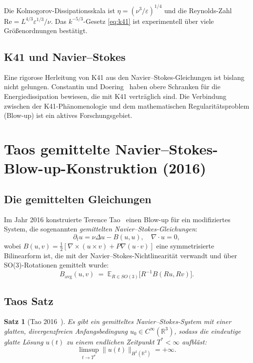 \documentclass[12pt,a4paper]{article}
\newtheorem{theorem}{Satz}[section]
\theoremstyle{remark}
\begin{document}
Die Kolmogorov-Dissipationsskala ist $\eta = (\nu^3/\varepsilon)^{1/4}$ und die Reynolds-Zahl
$\mathrm{Re} = L^{4/3}\varepsilon^{1/3}/\nu$. Das $k^{-5/3}$-Gesetz \eqref{eq:k41}
ist experimentell über viele Größenordnungen bestätigt.

\subsection{K41 und Navier--Stokes}

Eine rigorose Herleitung von K41 aus den Navier--Stokes-Gleichungen ist bislang nicht
gelungen. Constantin und Doering~\cite{ConstantinDoering1994} haben obere Schranken für
die Energiedissipation bewiesen, die mit K41 verträglich sind. Die Verbindung zwischen der
K41-Phänomenologie und dem mathematischen Regularitätsproblem (Blow-up) ist ein aktives
Forschungsgebiet.

\section{Taos gemittelte Navier--Stokes-Blow-up-Konstruktion (2016)}

\subsection{Die gemittelten Gleichungen}

Im Jahr 2016 konstruierte Terence Tao~\cite{Tao2016} einen Blow-up für ein modifiziertes
System, die sogenannten \emph{gemittelten Navier--Stokes-Gleichungen}:
\[
  \partial_t u = \nu\Delta u - B(u,u), \quad \nabla\cdot u = 0,
\]
wobei $B(u,v) = \frac{1}{2}[\nabla\times(u\times v) + P\nabla(u\cdot v)]$ eine
symmetrisierte Bilinearform ist, die mit der Navier--Stokes-Nichtlinearität verwandt und
über SO(3)-Rotationen gemittelt wurde:
\[
  B_{\mathrm{avg}}(u,v) \;=\; \mathbb{E}_{R \in SO(3)}\bigl[R^{-1}B(Ru, Rv)\bigr].
\]

\subsection{Taos Satz}

\begin{theorem}[Tao 2016~\cite{Tao2016}]
  Es gibt ein gemitteltes Navier--Stokes-System mit einer glatten, divergenzfreien
  Anfangsbedingung $u_0 \in C^\infty(\mathbb{R}^3)$, sodass die eindeutige glatte Lösung
  $u(t)$ zu einem endlichen Zeitpunkt $T^* < \infty$ aufbläst:
  \[
    \limsup_{t \to T^*} \|u(t)\|_{H^1(\mathbb{R}^3)} = +\infty.
  \]
\end{theorem}
\end{document}
